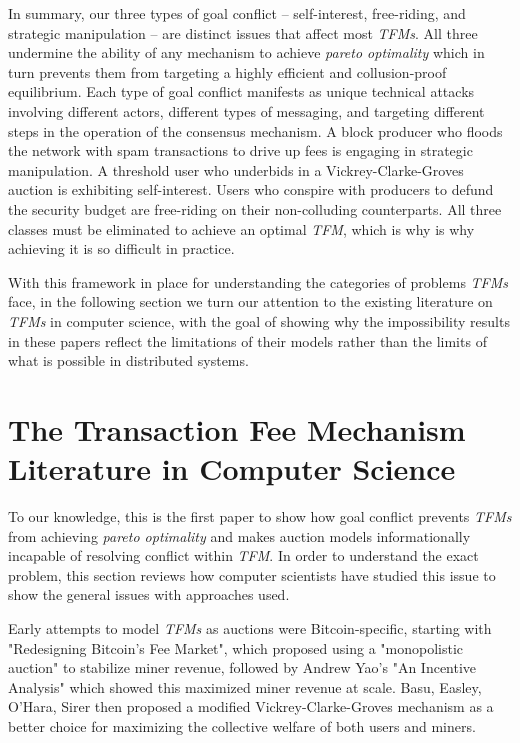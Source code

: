 \documentclass[sigconf,anonymous]{aamas}
\begin{document}
In summary, our three types of goal conflict -- self-interest, free-riding, and strategic manipulation -- are distinct issues that affect most \textit{TFMs}. All three undermine the ability of any mechanism to achieve \textit{pareto optimality} which in turn prevents them from targeting a highly efficient and collusion-proof equilibrium. Each type of goal conflict manifests as unique technical attacks involving different actors, different types of messaging, and targeting different steps in the operation of the consensus mechanism. A block producer who floods the network with spam transactions to drive up fees is engaging in strategic manipulation. A threshold user who underbids in a Vickrey-Clarke-Groves auction is exhibiting self-interest. Users who conspire with producers to defund the security budget are free-riding on their non-colluding counterparts. All three classes must be eliminated to achieve an optimal \textit{TFM}, which is why is why achieving it is so difficult in practice.

With this framework in place for understanding the categories of problems \textit{TFMs} face, in the following section we turn our attention to the existing literature on \textit{TFMs} in computer science, with the goal of showing why the impossibility results in these papers reflect the limitations of their models rather than the limits of what is possible in distributed systems.


\section{The Transaction Fee Mechanism Literature in Computer Science\label{sec::section1p2}}

To our knowledge, this is the first paper to show how goal conflict prevents \textit{TFMs} from achieving \textit{pareto optimality} and makes auction models informationally incapable of resolving conflict within \textit{TFM}. In order to understand the exact problem, this section reviews how computer scientists have studied this issue to show the general issues with approaches used.

Early attempts to model \textit{TFMs} as auctions were Bitcoin-specific, starting with "Redesigning Bitcoin's Fee Market", which proposed using a "monopolistic auction" to stabilize miner revenue, followed by Andrew Yao's "An Incentive Analysis" which showed this maximized miner revenue at scale. Basu, Easley, O’Hara, Sirer then proposed a modified Vickrey-Clarke-Groves mechanism as a better choice for maximizing the collective welfare of both users and miners.
\end{document}
